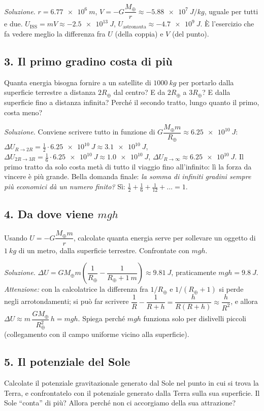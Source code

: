 \documentclass[11pt]{report}
\begin{document}
\emph{Soluzione.} $r = \SI{6.77e6}{m}$,
$V = -G\dfrac{M_\oplus}{r} \approx \SI{-5.88e7}{J/kg}$, uguale per tutti e due.
$U_\text{ISS} = mV \approx \SI{-2.5e13}{J}$, $U_\text{astronauta}
\approx \SI{-4.7e9}{J}$. È l'esercizio che fa vedere meglio la differenza
fra $U$ (della coppia) e $V$ (del punto).

\subsection*{3. Il primo gradino costa di più}
Quanta energia bisogna fornire a un satellite di $\SI{1000}{kg}$ per
portarlo dalla superficie terrestre a distanza $2R_\oplus$ dal centro? E da
$2R_\oplus$ a $3R_\oplus$? E dalla superficie fino a distanza infinita?
Perché il secondo tratto, lungo quanto il primo, costa meno?

\emph{Soluzione.} Conviene scrivere tutto in funzione di
$G\dfrac{M_\oplus m}{R_\oplus} \approx \SI{6.25e10}{J}$:
$\Delta U_{R\to2R} = \tfrac12 \cdot \SI{6.25e10}{J} \approx \SI{3.1e10}{J}$,
$\Delta U_{2R\to3R} = \tfrac16 \cdot \SI{6.25e10}{J} \approx \SI{1.0e10}{J}$,
$\Delta U_{R\to\infty} \approx \SI{6.25e10}{J}$. Il primo tratto da solo
costa metà di tutto il viaggio fino all'infinito: lì la forza da vincere è
più grande. Bella domanda finale: \emph{la somma di infiniti gradini sempre
più economici dà un numero finito?} Sì: $\tfrac12+\tfrac16+\tfrac1{12}+\dots = 1$.

\subsection*{4. Da dove viene $mgh$}
Usando $U = -G\dfrac{M_\oplus m}{r}$, calcolate quanta energia serve per
sollevare un oggetto di $\SI{1}{kg}$ di un metro, dalla superficie
terrestre. Confrontate con $mgh$.

\emph{Soluzione.} $\Delta U = GM_\oplus m\left(\dfrac1{R_\oplus}-\dfrac1{R_\oplus+\SI{1}{m}}\right)
\approx \SI{9.81}{J}$, praticamente $mgh = \SI{9.8}{J}$. \emph{Attenzione:}
con la calcolatrice la differenza fra $1/R_\oplus$ e $1/(R_\oplus+1)$ si perde
negli arrotondamenti; si può far scrivere
$\dfrac1{R}-\dfrac1{R+h} = \dfrac{h}{R(R+h)} \approx \dfrac{h}{R^2}$, e allora
$\Delta U \approx m\,\dfrac{GM_\oplus}{R_\oplus^2}\,h = mgh$. Spiega perché $mgh$
funziona solo per dislivelli piccoli (collegamento con il campo uniforme
vicino alla superficie).

\subsection*{5. Il potenziale del Sole}
Calcolate il potenziale gravitazionale generato dal Sole nel punto in cui si
trova la Terra, e confrontatelo con il potenziale generato dalla Terra sulla
sua superficie. Il Sole ``conta'' di più? Allora perché non ci accorgiamo
della sua attrazione?
\end{document}
